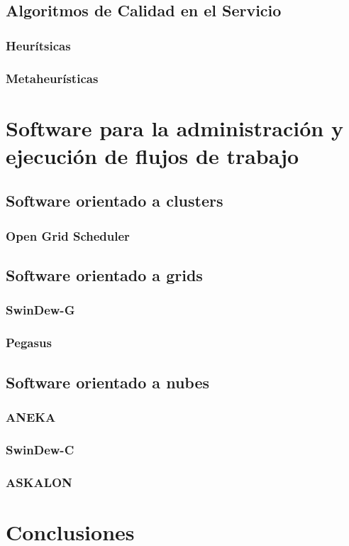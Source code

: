 \documentclass[letterpaper, 12pt]{report}
\begin{document}
\section{Algoritmos de Calidad en el Servicio}
\subsection{Heurítsicas}
\subsection{Metaheurísticas}

\chapter{Software para la administración y ejecución de flujos de trabajo}

\section{Software orientado a clusters}

\subsection{Open Grid Scheduler}

\section{Software orientado a grids}

\subsection{SwinDew-G}

\subsection{Pegasus}

\section{Software orientado a nubes}

\subsection{ANEKA}

\subsection{SwinDew-C}

\subsection{ASKALON}


\chapter{Conclusiones}



\end{document}
